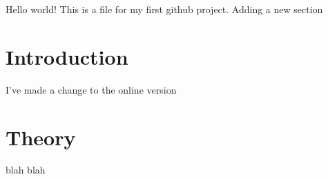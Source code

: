 \documentclass{article}
\begin{document}
Hello world! This is a file for my first github project. Adding a new section
\section{Introduction}

I've made a change to the online version

\section{Theory}

blah blah
\end{document}
